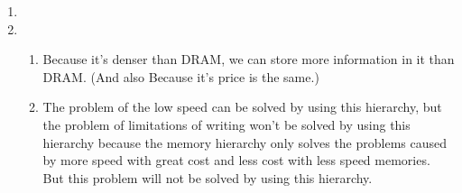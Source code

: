 \documentclass[12pt]{article}
\begin{document}
    \begin{enumerate}
        \item

        \item
            \begin{enumerate}
                \item
                    Because it's denser than DRAM, we can store more information
                    in it than DRAM. (And also Because it's price is the same.)
                \item
                    The problem of the low speed can be solved by using this
                    hierarchy, but the problem of limitations of writing won't
                    be solved by using this hierarchy because the memory hierarchy
                    only solves the problems caused by more speed with great cost
                    and less cost with less speed memories. But this problem will
                    not be solved by using this hierarchy.





            \end{enumerate}
    \end{enumerate}
\end{document}
